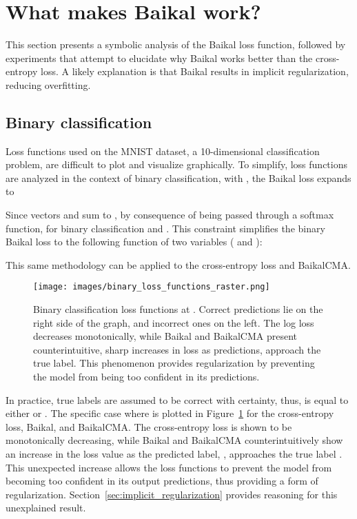 \documentclass[conference]{IEEEtran}
\begin{document}
\section{What makes Baikal work?}

This section presents a symbolic analysis of the Baikal loss function, followed by experiments that attempt to elucidate why Baikal works better than the cross-entropy loss. A likely explanation is that Baikal results in implicit regularization, reducing overfitting.

\subsection{Binary classification}
\label{sec:binary_classification}

Loss functions used on the MNIST dataset, a 10-dimensional classification problem, are difficult to plot and visualize graphically. To simplify, loss functions are analyzed in the context of binary classification, with , the Baikal loss expands to

Since vectors  and  sum to , by consequence of being passed through a softmax function, for binary classification  and . This constraint simplifies the binary Baikal loss to the following function of two variables ( and ):

This same methodology can be applied to the cross-entropy loss and BaikalCMA.




\begin{figure}
  \centering
\texttt{[image: images/binary\_loss\_functions\_raster.png]}
  \caption{Binary classification loss functions at . Correct predictions lie on the right side of the graph, and incorrect ones on the left. The log loss decreases monotonically, while Baikal and BaikalCMA present counterintuitive, sharp increases in loss as predictions, approach the true label. This phenomenon provides regularization by preventing the model from being too confident in its predictions.}
  \label{fig:binary_losses}
\end{figure}

In practice, true labels are assumed to be correct with certainty, thus,  is equal to either  or . The specific case where  is plotted in Figure~\ref{fig:binary_losses} for the cross-entropy loss, Baikal, and BaikalCMA. The cross-entropy loss is shown to be monotonically decreasing, while Baikal and BaikalCMA counterintuitively show an increase in the loss value as the predicted label, , approaches the true label . This unexpected increase allows the loss functions to prevent the model from becoming too confident in its output predictions, thus providing a form of regularization. Section~\ref{sec:implicit_regularization} provides reasoning for this unexplained result.
\end{document}
